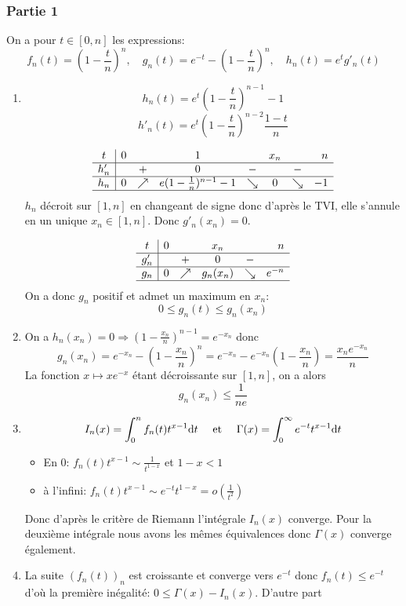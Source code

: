 \documentclass{article}
\def \de {{\rm d}}
\begin{document}
\subsubsection*{Partie 1}
On a pour  $t\in [0,n]$ les expressions:
\[f_n(t)=(1-\frac tn)^n,\quad g_n(t)=e^{-t}-(1-\frac tn)^n,\quad h_n(t)=e^tg'_n(t)\] 
\begin{enumerate}
\item \[h_n(t)=e^t \left(1-\frac tn\right)^{n-1}-1\]
\[h'_n(t)=e^t \left(1-\frac tn\right)^{n-2}\frac{1-t}{n}\]

\[\begin{array}{c|lcccccr}
t&0&&1&&x_n&&n \\ \hline
h'_n&&+&0&-&&-&\\ \hline
h_n&0&\nearrow &e(1-\frac 1n)^{n-1}-1&\searrow&0&\searrow&-1\\ \hline
\end{array}\]
$h_n$ décroit sur $[1,n]$ en changeant de signe donc d'après le TVI, elle s'annule en un unique $x_n\in[1,n]$. Donc $g'_n(x_n)=0$.

\[\begin{array}{c|lcccr}
t&0&&x_n&&n \\ \hline
g'_n&&+&0&-&\\ \hline
g_n&0&\nearrow &g_n(x_n)&\searrow&e^{-n}\\ \hline
\end{array}\]
On a donc $g_n$ positif et admet un maximum en $x_n$:
\[0\leq g_n(t)\leq g_n(x_n)\]

\item On a $h_n(x_n)=0 \Longrightarrow (1-\frac{x_n}{n})^{n-1}=e^{-x_n}$ donc
\[g_n(x_n)=e^{-x_n}-(1-\frac{x_n}{n})^{n}=e^{-x_n}-e^{-x_n}(1-\frac{x_n}{n})=\frac{x_n e^{-x_n}}{n}\]
La fonction $x\mapsto xe^{-x}$ étant décroissante sur $[1,n]$, on a alors
 \[g_n(x_n)\leq \frac{1}{ne}\]
\item 
\[I_n(x)=\int_0^nf_n(t)t^{x-1}\de t\quad\mbox{ et }\quad \Gamma(x)=\int_0^\infty  e^{-t}t^{x-1}\de t\]
\begin{itemize}
\item En 0: $f_n(t)t^{x-1}\sim \frac{1}{t^{1-x}}$ et $1-x<1$
\item à l'infini: $f_n(t)t^{x-1}\sim e^{-t}t^{1-x}=o(\frac{1}{t^2})$
\end{itemize}
Donc d'après le critère de Riemann l'intégrale $I_n(x)$ converge. Pour la deuxième intégrale nous avons les mêmes équivalences donc $\Gamma(x)$ converge également.
\item La suite $(f_n(t))_n$ est croissante et converge vers $e^{-t}$ donc $f_n(t)\leq e^{-t}$ d'où la première inégalité: $0\leq \Gamma(x) - I_n(x)$. D'autre part


\end{enumerate}
\end{document}
